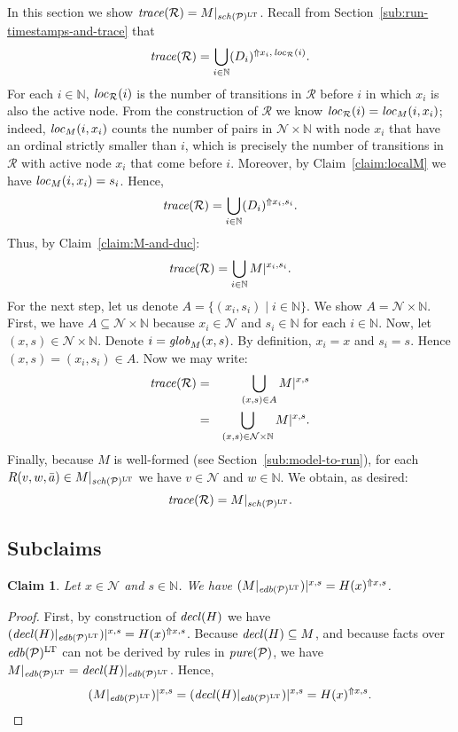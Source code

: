 \documentclass{tlp}
\newtheorem{claim}[theorem]{Claim}
\newcommand{\Nat}{\mathbb{N}}  \newcommand{\len}[1]{|#1|} \newcommand{\rom}[1]{\text{\emph{(#1)}}} \newcommand{\romI}{\rom i}
\newcommand{\ded}{\mathcal{P}}
\newcommand{\proj}[2]{#1|_{#2}}
\newcommand{\edb}[1]{\fname{edb}(#1)}
\newcommand{\schof}[1]{\fname{sch}(#1)}
\newcommand{\nw}{\mathcal{N}}
\newcommand{\sh}[1]{(#1)}
\newcommand{\toloct}[1]{#1^{\mathrm{LT}}}
\newcommand{\addlt}[3]{#1^{\Uparrow#2,#3}}
\newcommand{\projlt}[3]{#1|^{#2,#3}}
\newcommand{\shprojlt}[3]{\projlt{\sh{#1}}{#2}{#3}}
\newcommand{\decl}[1]{\fname{decl}(#1)}
\newcommand{\pure}[1]{\fname{pure}(#1)}
\newcommand{\run}{\mathcal{R}}
\newcommand{\trace}[1]{\fname{trace}(#1)}
\newcommand{\locR}[1]{\fname{loc}_{\run}(#1)}
\newcommand{\nwnat}{\nw\times\Nat}
\newcommand{\globM}[1]{\fname{glob}_{M}(#1)}
\newcommand{\locM}[1]{\fname{loc}_{M}(#1)}
\begin{document}
\begin{appendix}
In this section we show $\trace{\run}=\proj M{\toloct{\schof{\ded}}}$.
Recall from Section~\ref{sub:run-timestamps-and-trace} that
\[
\trace{\run}=\bigcup_{i\in\Nat}(\addlt{D_{i})}{x_{i}}{\,\locR i}.
\]
For each $i\in\Nat$, $\locR i$ is the number of transitions in $\run$
before $i$ in which $x_{i}$ is also the active node. From the construction
of $\run$ we know $\locR i=\locM{i,x_{i}}$; indeed, $\locM{i,x_{i}}$
counts the number of pairs in $\nwnat$ with node $x_{i}$ that have
an ordinal strictly smaller than $i$, which is precisely the number
of transitions in $\run$ with active node $x_{i}$ that come before
$i$. Moreover, by Claim~\ref{claim:localM} we have $\locM{i,x_{i}}=s_{i}$.
Hence, 
\[
\trace{\run}=\bigcup_{i\in\Nat}\addlt{(D_{i})}{x_{i}}{s_{i}}.
\]
Thus, by Claim~\ref{claim:M-and-duc}:
\[
\trace{\run}=\bigcup_{i\in\Nat}\projlt M{x_{i}}{s_{i}}.
\]
For the next step, let us denote $A=\{(x_{i},s_{i})\mid i\in\Nat\}$.
We show $A=\nwnat$. First, we have $A\subseteq\nwnat$ because $x_{i}\in\nw$
and $s_{i}\in\Nat$ for each $i\in\Nat$. Now, let $(x,s)\in\nwnat$.
Denote $i=\globM{x,s}$. By definition, $x_{i}=x$ and $s_{i}=s$.
Hence $(x,s)=(x_{i},s_{i})\in A$. Now we may write:
\begin{eqnarray*}
\trace{\run} & = & \bigcup_{(x,s)\in A}\projlt Mxs\\
 & = & \bigcup_{(x,s)\in\nwnat}\projlt Mxs.
\end{eqnarray*}
Finally, because $M$ is well-formed (see Section~\ref{sub:model-to-run}),
for each $R(v,w,\bar{a})\in\proj M{\toloct{\schof{\ded}}}$ we have
$v\in\nw$ and $w\in\Nat$. We obtain, as desired:
\[
\trace{\run}=\proj M{\toloct{\schof{\ded}}}.
\]



\subsection{Subclaims}

\label{sub:model-to-run--claims}



\begin{claim}\label{claim:edb-in-M}Let $x\in\nw$ and $s\in\Nat$.
We have $\shprojlt{\proj M{\toloct{\edb{\ded}}}}xs=\addlt{H(x)}xs$.\end{claim}

\begin{proof}First, by construction of $\decl H$ we have $\shprojlt{\proj{\decl H}{\toloct{\edb{\ded}}}}xs=\addlt{H(x)}xs$.
Because $\decl H\subseteq M$, and because facts over $\toloct{\edb{\ded}}$
can not be derived by rules in $\pure{\ded}$, we have $\proj M{\toloct{\edb{\ded}}}=\proj{\decl H}{\toloct{\edb{\ded}}}$.
Hence, 
\[
\shprojlt{\proj M{\toloct{\edb{\ded}}}}xs=\shprojlt{\proj{\decl H}{\toloct{\edb{\ded}}}}xs=\addlt{H(x)}xs.
\]
\end{proof}




\end{appendix}
\end{document}
